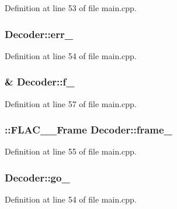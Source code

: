 Definition at line 53 of file main.\+cpp.

\subsubsection[{\texorpdfstring{err\+\_\+}{err_}}]{ Decoder\+::err\+\_\+}\hypertarget{class_decoder_acc4aa5d5e582ec5ed9a3ad3316017925}{}\label{class_decoder_acc4aa5d5e582ec5ed9a3ad3316017925}


Definition at line 54 of file main.\+cpp.

\subsubsection[{\texorpdfstring{f\+\_\+}{f_}}]{\& Decoder\+::f\+\_\+\hspace{0.3cm}{\ttfamily [protected]}}\hypertarget{class_decoder_af37db338bb18f556600335d9f82c8fb2}{}\label{class_decoder_af37db338bb18f556600335d9f82c8fb2}


Definition at line 57 of file main.\+cpp.

\subsubsection[{\texorpdfstring{frame\+\_\+}{frame_}}]{\setlength{\rightskip}{0pt plus 5cm}\+::{\bf F\+L\+A\+C\+\_\+\+\_\+\+Frame} Decoder\+::frame\+\_\+}\hypertarget{class_decoder_a67321d1abcae24336f64d6d620d12cad}{}\label{class_decoder_a67321d1abcae24336f64d6d620d12cad}


Definition at line 55 of file main.\+cpp.

\subsubsection[{\texorpdfstring{go\+\_\+}{go_}}]{ Decoder\+::go\+\_\+}\hypertarget{class_decoder_ade7cfa226613d187dd8dee95266038e5}{}\label{class_decoder_ade7cfa226613d187dd8dee95266038e5}


Definition at line 54 of file main.\+cpp.

